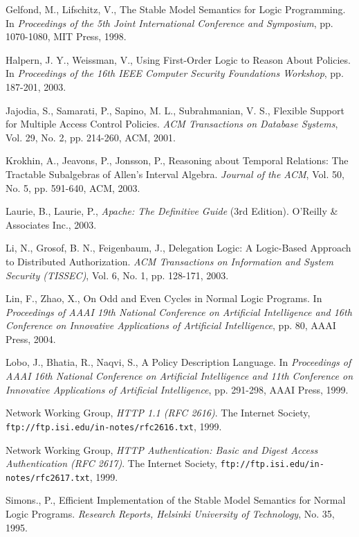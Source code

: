 \documentclass[global,twocolumn,final]{svjour}
\begin{document}
\begin{thebibliography}{5}
      Gelfond, M., Lifschitz, V.,
      The Stable Model Semantics for Logic Programming.
      In {\em Proceedings of the 5th Joint International Conference and
      Symposium},
      pp. 1070-1080, MIT Press, 1998.

      Halpern, J. Y., Weissman, V.,
      Using First-Order Logic to Reason About Policies.
      In {\em Proceedings of the 16th IEEE Computer Security Foundations
      Workshop}, pp. 187-201, 2003.

      Jajodia, S., Samarati, P., Sapino, M. L., Subrahmanian, V. S.,
      Flexible Support for Multiple Access Control Policies.
      {\em ACM Transactions on Database Systems},
      Vol. 29, No. 2, pp. 214-260, ACM, 2001.

      Krokhin, A., Jeavons, P., Jonsson, P.,
      Reasoning about Temporal Relations: The Tractable Subalgebras of
      Allen's Interval Algebra.
      {\em Journal of the ACM},
      Vol. 50, No. 5, pp. 591-640, ACM, 2003.

      Laurie, B., Laurie, P.,
      {\em Apache: The Definitive Guide} (3rd Edition).
      O'Reilly \& Associates Inc., 2003.

      Li, N., Grosof, B. N., Feigenbaum, J.,
      Delegation Logic: A Logic-Based Approach to Distributed Authorization.
      {\em ACM Transactions on Information and System Security (TISSEC)},
      Vol. 6, No. 1, pp. 128-171, 2003.

      Lin, F., Zhao, X.,
      On Odd and Even Cycles in Normal Logic Programs.
      In {\em Proceedings of AAAI 19th National Conference on Artificial
      Intelligence and 16th Conference on Innovative Applications of Artificial
      Intelligence},
      pp. 80, AAAI Press, 2004.

      Lobo, J., Bhatia, R., Naqvi, S.,
      A Policy Description Language.
      In {\em Proceedings of AAAI 16th National Conference on Artificial
      Intelligence and 11th Conference on Innovative Applications of Artificial
      Intelligence},
      pp. 291-298, AAAI Press, 1999.

      Network Working Group,
      {\em HTTP 1.1 (RFC 2616)}.
      The Internet Society,
      {\tt \scriptsize ftp://ftp.isi.edu/in-notes/rfc2616.txt},
      1999.

      Network Working Group,
      {\em HTTP Authentication: Basic and Digest Access Authentication (RFC 2617)}.
      The Internet Society,
      {\tt \scriptsize ftp://ftp.isi.edu/in-notes/rfc2617.txt},
      1999.

      Simons., P.,
      Efficient Implementation of the Stable Model Semantics for Normal Logic
      Programs.
      {\em Research Reports, Helsinki University of Technology},
      No. 35, 1995.
  \end{thebibliography}
\end{document}
